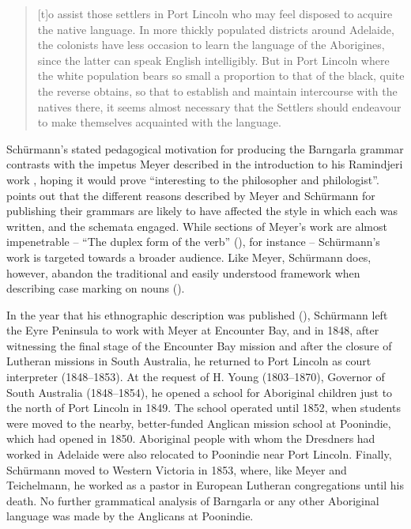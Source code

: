 \begin{quote}
[t]o assist those settlers in Port Lincoln who may feel disposed to acquire the native language. In more thickly populated districts around Adelaide, the colonists have less occasion to learn the language of the Aborigines, since the latter can speak English intelligibly. But in Port Lincoln where the white population bears so small a proportion to that of the black, quite the reverse obtains, so that to establish and maintain intercourse with the natives there, it seems almost necessary that the Settlers should endeavour to make themselves acquainted with the language. \citep[iii]{schurmann_vocabulary_1844}
\end{quote}

Schürmann’s stated pedagogical motivation for producing the Barngarla grammar contrasts with the impetus Meyer described in the introduction to his Ramindjeri work \citeyearpar[vii]{meyer_vocabulary_1843}, hoping it would prove “interesting to the philosopher and philologist”. \citet{Simpson2021} points out that the different reasons described by Meyer and Schürmann for publishing their grammars are likely to have affected the style in which each was written, and the schemata engaged. While sections of Meyer’s work are almost impenetrable -- “The duplex form of the verb” (), for instance -- Schürmann’s work is targeted towards a broader audience. Like Meyer, Schürmann does, however, abandon the traditional and easily understood framework when describing case marking on nouns ().

In the year that his ethnographic description was published (\citeyear{schurmann_aboriginal_1846}), Schürmann left the Eyre Peninsula to work with Meyer at Encounter Bay, and in 1848, after witnessing the final stage of the Encounter Bay mission and after the closure of Lutheran missions in South Australia, he returned to Port Lincoln as court interpreter (1848--1853). At the request of H. Young (1803--1870), Governor of South Australia (1848--1854), he opened a school for Aboriginal children just to the north of Port Lincoln in 1849. The school operated until 1852, when students were moved to the nearby, better-funded Anglican mission school at Poonindie, which had opened in 1850. Aboriginal people with whom the Dresdners had worked in Adelaide were also relocated to Poonindie near Port Lincoln. Finally, Schürmann moved to Western Victoria in 1853, where, like Meyer and Teichelmann, he worked as a pastor in European Lutheran congregations until his death. No further grammatical analysis of Barngarla or any other Aboriginal language was made by the Anglicans at Poonindie.

